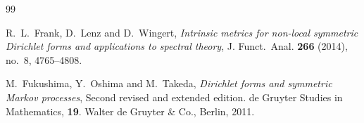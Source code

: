 \documentclass[12pt,a4paper]{article}
\newcommand{\1}{{\bf 1}}
\begin{document}
\begin{thebibliography}{99}
%
%


%
          {R.~L.~Frank, D.~Lenz and D.~Wingert}, 
          \emph{Intrinsic metrics for non-local symmetric Dirichlet  forms and applications to spectral theory}, 
          J. Funct.\ Anal. {\bf 266} (2014), no.~8, 4765--4808.

% 
  
    {M.~Fukushima, Y.~Oshima and M.~Takeda},
   \emph{Dirichlet forms and symmetric Markov processes}, Second revised and extended edition. de Gruyter Studies in Mathematics, {\bf 19}. Walter de Gruyter \& Co., Berlin, 2011. 






\end{thebibliography}
\end{document}
